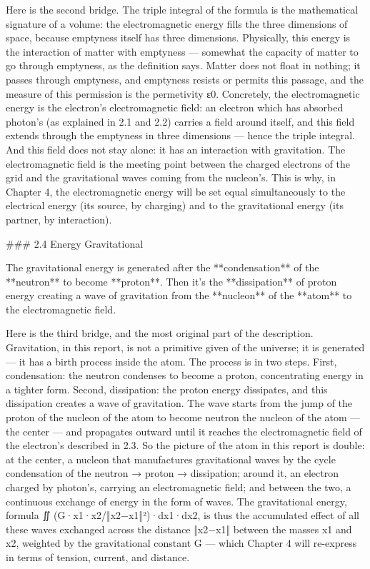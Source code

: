 \documentclass[12pt, letterpaper]{article}
\begin{document}
Here is the second bridge. The triple integral of the formula is the mathematical signature of a volume: the electromagnetic energy fills the three dimensions of space, because emptyness itself has three dimensions. Physically, this energy is the interaction of matter with emptyness — somewhat the capacity of matter to go through emptyness, as the definition says. Matter does not float in nothing; it passes through emptyness, and emptyness resists or permits this passage, and the measure of this permission is the permetivity ε0. Concretely, the electromagnetic energy is the electron's electromagnetic field: an electron which has absorbed photon's (as explained in 2.1 and 2.2) carries a field around itself, and this field extends through the emptyness in three dimensions — hence the triple integral. And this field does not stay alone: it has an interaction with gravitation. The electromagnetic field is the meeting point between the charged electrons of the grid and the gravitational waves coming from the nucleon's. This is why, in Chapter 4, the electromagnetic energy will be set equal simultaneously to the electrical energy (its source, by charging) and to the gravitational energy (its partner, by interaction).

### 2.4 Energy Gravitational

The gravitational energy is generated after the **condensation** of the **neutron** to become **proton**. Then it's the **dissipation** of proton energy creating a wave of gravitation from the **nucleon** of the **atom** to the electromagnetic field.

Here is the third bridge, and the most original part of the description. Gravitation, in this report, is not a primitive given of the universe; it is generated — it has a birth process inside the atom. The process is in two steps. First, condensation: the neutron condenses to become a proton, concentrating energy in a tighter form. Second, dissipation: the proton energy dissipates, and this dissipation creates a wave of gravitation. The wave starts from the jump of the proton of the nucleon of the atom to become neutron the nucleon of the atom — the center — and propagates outward until it reaches the electromagnetic field of the electron's described in 2.3. So the picture of the atom in this report is double: at the center, a nucleon that manufactures gravitational waves by the cycle condensation of the neutron → proton → dissipation; around it, an electron charged by photon's, carrying an electromagnetic field; and between the two, a continuous exchange of energy in the form of waves. The gravitational energy, formula ∬ (G·x1·x2/‖x2−x1‖²)·dx1·dx2, is thus the accumulated effect of all these waves exchanged across the distance ‖x2−x1‖ between the masses x1 and x2, weighted by the gravitational constant G — which Chapter 4 will re-express in terms of tension, current, and distance.
	
\end{document}

